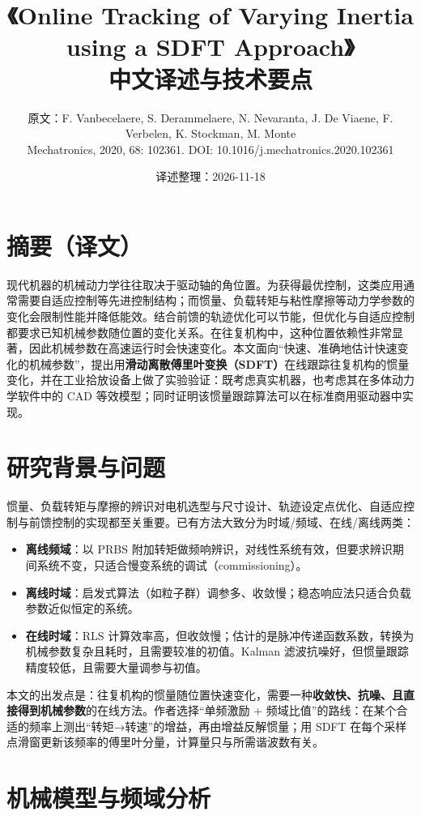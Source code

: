 \documentclass[UTF8,a4paper,11pt]{ctexart}
\title{\textbf{《Online Tracking of Varying Inertia using a SDFT Approach》\\中文译述与技术要点}}
\author{原文：F. Vanbecelaere, S. Derammelaere, N. Nevaranta, J. De Viaene, F. Verbelen, K. Stockman, M. Monte\\ \small Mechatronics, 2020, 68: 102361. DOI: 10.1016/j.mechatronics.2020.102361}
\date{译述整理：2026-11-18}
\begin{document}
\maketitle

\section*{摘要（译文）}
现代机器的机械动力学往往取决于驱动轴的角位置。为获得最优控制，这类应用通常需要自适应控制等先进控制结构；而惯量、负载转矩与粘性摩擦等动力学参数的变化会限制性能并降低能效。结合前馈的轨迹优化可以节能，但优化与自适应控制都要求已知机械参数随位置的变化关系。在往复机构中，这种位置依赖性非常显著，因此机械参数在高速运行时会快速变化。本文面向“快速、准确地估计快速变化的机械参数”，提出用\textbf{滑动离散傅里叶变换（SDFT）}在线跟踪往复机构的惯量变化，并在工业拾放设备上做了实验验证：既考虑真实机器，也考虑其在多体动力学软件中的 CAD 等效模型；同时证明该惯量跟踪算法可以在标准商用驱动器中实现。

\section{研究背景与问题}
惯量、负载转矩与摩擦的辨识对电机选型与尺寸设计、轨迹设定点优化、自适应控制与前馈控制的实现都至关重要。已有方法大致分为时域/频域、在线/离线两类：
\begin{itemize}
  \item \textbf{离线频域}：以 PRBS 附加转矩做频响辨识，对线性系统有效，但要求辨识期间系统不变，只适合慢变系统的调试（commissioning）。
  \item \textbf{离线时域}：启发式算法（如粒子群）调参多、收敛慢；稳态响应法只适合负载参数近似恒定的系统。
  \item \textbf{在线时域}：RLS 计算效率高，但收敛慢；估计的是脉冲传递函数系数，转换为机械参数复杂且耗时，且需要较准的初值。Kalman 滤波抗噪好，但惯量跟踪精度较低，且需要大量调参与初值。
\end{itemize}
本文的出发点是：往复机构的惯量随位置快速变化，需要一种\textbf{收敛快、抗噪、且直接得到机械参数}的在线方法。作者选择“单频激励 + 频域比值”的路线：在某个合适的频率上测出“转矩→转速”的增益，再由增益反解惯量；用 SDFT 在每个采样点滑窗更新该频率的傅里叶分量，计算量只与所需谐波数有关。

\section{机械模型与频域分析}
\end{document}

